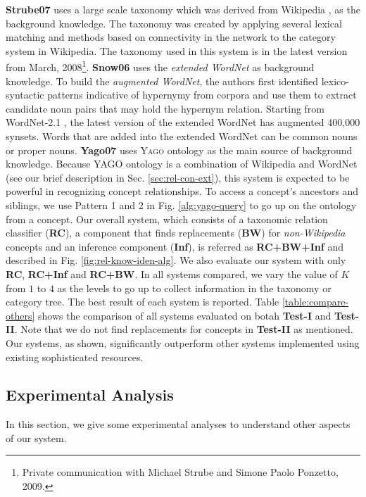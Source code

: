 {\bf Strube07} uses a large scale taxonomy which was derived from
Wikipedia \cite{wikitaxo07}, as the background knowledge. The taxonomy
was created by applying several lexical matching and methods based on
connectivity in the network to the category system in Wikipedia. The
taxonomy used in this system is in the latest version from March,
2008\footnote{Private communication with Michael Strube and Simone
  Paolo Ponzetto, 2009.}. {\bf Snow06} uses the {\em extended WordNet}
\cite{ilprints665,Snow2006} as background knowledge. To build the {\em
  augmented WordNet}, the authors first identified lexico-syntactic
patterns indicative of hypernymy from corpora and use them to extract
candidate noun pairs that may hold the hypernym relation. Starting
from WordNet-2.1 \cite{Fellbaum98}, the latest version of the extended
WordNet has augmented 400,000 synsets. Words that are added into the
extended WordNet can be common nouns or proper nouns. {\bf Yago07}
uses \textsc{Yago} ontology \cite{suchanek2007WWW} as the main source
of background knowledge. Because YAGO ontology is a combination of
Wikipedia and WordNet (see our brief description in
Sec. \ref{sec:rel-con-ext}), this system is expected to be powerful in
recognizing concept relationships. To access a concept's ancestors and
siblings, we use Pattern 1 and 2 in Fig. \ref{alg:yago-query} to go up
on the ontology from a concept. Our overall system, which consists of
a taxonomic relation classifier ({\bf RC}), a component that finds
replacements ({\bf BW}) for {\em non-Wikipedia} concepts and an
inference component ({\bf Inf}), is referred as {\bf RC+BW+Inf} and
described in Fig. \ref{fig:rel-know-iden-alg}. We also evaluate our
system with only {\bf RC}, {\bf RC+Inf} and {\bf RC+BW}. In all
systems compared, we vary the value of $K$ from $1$ to $4$ as the
levels to go up to collect information in the taxonomy or category
tree. The best result of each system is reported. Table
\ref{table:compare-others} shows the comparison of all systems
evaluated on botah {\bf Test-I} and {\bf Test-II}. Note that we do not
find replacements for concepts in {\bf Test-II} as mentioned. Our
systems, as shown, significantly outperform other systems implemented
using existing sophisticated resources.

\subsection{Experimental Analysis}

In this section, we give some experimental analyses to understand
other aspects of our system.  

